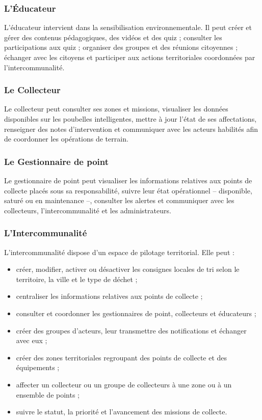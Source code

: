 \subsubsection{L'Éducateur}

L'éducateur intervient dans la sensibilisation environnementale. Il peut créer et gérer des contenus pédagogiques, des vidéos et des quiz ; consulter les participations aux quiz ; organiser des groupes et des réunions citoyennes ; échanger avec les citoyens et participer aux actions territoriales coordonnées par l'intercommunalité.

\subsubsection{Le Collecteur}

Le collecteur peut consulter ses zones et missions, visualiser les données disponibles sur les poubelles intelligentes, mettre à jour l'état de ses affectations, renseigner des notes d'intervention et communiquer avec les acteurs habilités afin de coordonner les opérations de terrain.

\subsubsection{Le Gestionnaire de point}

Le gestionnaire de point peut visualiser les informations relatives aux points de collecte placés sous sa responsabilité, suivre leur état opérationnel -- disponible, saturé ou en maintenance --, consulter les alertes et communiquer avec les collecteurs, l'intercommunalité et les administrateurs.

\subsubsection{L'Intercommunalité}

L'intercommunalité dispose d'un espace de pilotage territorial. Elle peut :
\begin{itemize}
    \item créer, modifier, activer ou désactiver les consignes locales de tri selon le territoire, la ville et le type de déchet ;
    \item centraliser les informations relatives aux points de collecte ;
    \item consulter et coordonner les gestionnaires de point, collecteurs et éducateurs ;
    \item créer des groupes d'acteurs, leur transmettre des notifications et échanger avec eux ;
    \item créer des zones territoriales regroupant des points de collecte et des équipements ;
    \item affecter un collecteur ou un groupe de collecteurs à une zone ou à un ensemble de points ;
    \item suivre le statut, la priorité et l'avancement des missions de collecte.
\end{itemize}

